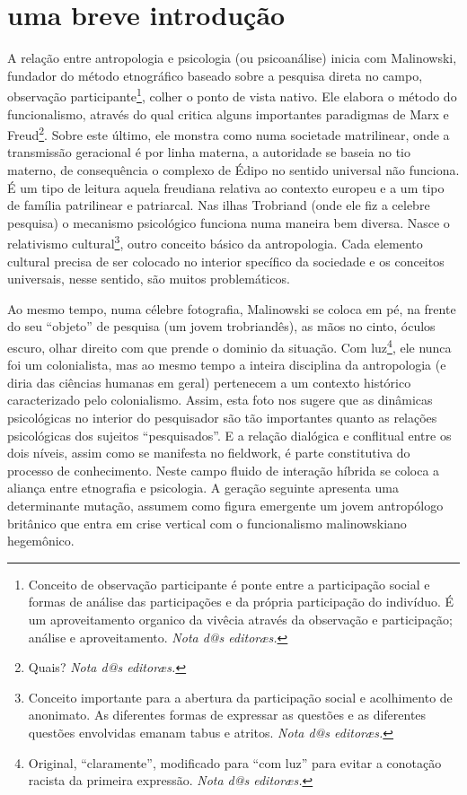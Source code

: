 \documentclass[a4paper, 11pt]{article} %
\makeatletter
\newcommand{\ftnt}[1]{\footnote{#1 \emph{Nota d@s editoræs.}}}
\makeatother
\begin{document}
\section*{uma breve introdução}\label{sec:start}
A relação entre antropologia e psicologia (ou psicoanálise) inicia com Malinowski, fundador do método etnográfico baseado sobre a pesquisa direta no campo, observação participante\ftnt{Conceito de observação participante é ponte entre a participação social e formas de análise das participações e da própria participação do indivíduo. É um aproveitamento organico da vivêcia através da observação e participação; análise e aproveitamento.}, colher o ponto de vista nativo. Ele elabora o método do funcionalismo, através  do qual critica alguns importantes paradigmas de Marx e Freud\ftnt{Quais?}. Sobre este último, ele monstra como numa societade matrilinear, onde a transmissão geracional é  por linha materna,  a autoridade se baseia no tio materno, de consequência o complexo de Édipo no sentido universal não funciona. É  um tipo de leitura aquela freudiana relativa ao contexto europeu e a um tipo de família patrilinear e patriarcal. Nas ilhas Trobriand (onde ele fiz a celebre pesquisa) o mecanismo psicológico funciona numa maneira bem diversa. Nasce o relativismo cultural\ftnt{Conceito importante para a abertura da participação social e acolhimento de anonimato. As diferentes formas de expressar as questões e as diferentes questões envolvidas emanam tabus e atritos.}, outro conceito básico da antropologia. Cada elemento cultural precisa de ser colocado no interior specífico da sociedade e os conceitos universais, nesse sentido, são muitos problemáticos. 

Ao mesmo tempo, numa célebre fotografia, Malinowski se coloca em pé, na frente do seu “objeto” de pesquisa (um jovem trobriandês), as mãos no cinto, óculos escuro, olhar direito com que prende o dominio da situação. Com luz\ftnt{Original, ``claramente'', modificado para ``com luz'' para evitar a conotação racista da primeira expressão.}, ele nunca foi um colonialista, mas ao mesmo tempo a inteira disciplina da antropologia (e diria das ciências humanas em geral) pertenecem a um contexto histórico caracterizado pelo colonialismo. Assim, esta foto nos sugere que as dinâmicas psicológicas no interior do pesquisador são tão importantes  quanto as relações psicológicas dos sujeitos “pesquisados”. E a relação dialógica e conflitual entre os dois níveis, assim como se manifesta no fieldwork, é  parte constitutiva do processo de conhecimento. Neste campo fluido de interação híbrida se coloca a aliança entre etnografia e psicologia. A geração seguinte apresenta uma determinante mutação, assumem como figura emergente um jovem antropólogo britânico que entra em crise vertical com o funcionalismo malinowskiano hegemônico.
\end{document}
